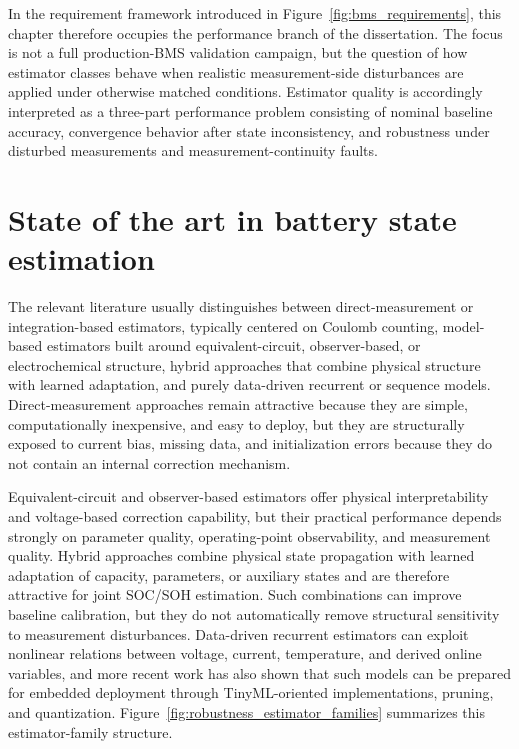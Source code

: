 \documentclass[
    a4paper,
    12pt,
    titlepage,
    bibliography=totoc,
    twoside=on,
    parskip=false,
    numbers=noenddot,
    cleardoublepage=empty,
    DIV=12,
    BCOR=12.0mm,
    headheight=36pt,
    headings=openright
]{scrreprt}
\begin{document}
In the requirement framework introduced in Figure~\ref{fig:bms_requirements}, this chapter therefore occupies the performance branch of the dissertation. The focus is not a full production-BMS validation campaign, but the question of how estimator classes behave when realistic measurement-side disturbances are applied under otherwise matched conditions. Estimator quality is accordingly interpreted as a three-part performance problem consisting of nominal baseline accuracy, convergence behavior after state inconsistency, and robustness under disturbed measurements and measurement-continuity faults.

\section{State of the art in battery state estimation}
The relevant literature usually distinguishes between direct-measurement or integration-based estimators, typically centered on Coulomb counting, model-based estimators built around equivalent-circuit, observer-based, or electrochemical structure, hybrid approaches that combine physical structure with learned adaptation, and purely data-driven recurrent or sequence models.\autocite{khanComparativeStudyDifferent2022,shrivastavaReviewTechnologicalAdvancement2023,guoSystematicReviewElectrochemical2024,yaoSmarterBatteryManagement2025b} Direct-measurement approaches remain attractive because they are simple, computationally inexpensive, and easy to deploy, but they are structurally exposed to current bias, missing data, and initialization errors because they do not contain an internal correction mechanism.\autocite{khanComparativeStudyDifferent2022,liRobustnessSOCEstimation2015}

Equivalent-circuit and observer-based estimators offer physical interpretability and voltage-based correction capability, but their practical performance depends strongly on parameter quality, operating-point observability, and measurement quality.\autocite{gaoEnhancedStateofchargeEstimation2022,guoSystematicReviewElectrochemical2024,liRobustnessSOCEstimation2015} Hybrid approaches combine physical state propagation with learned adaptation of capacity, parameters, or auxiliary states and are therefore attractive for joint SOC/SOH estimation.\autocite{gaoCoEstimationStateofChargeStateof2022,shenAlternativeCombinedCoestimation2022,wangFusionEstimationLithiumion2022} Such combinations can improve baseline calibration, but they do not automatically remove structural sensitivity to measurement disturbances. Data-driven recurrent estimators can exploit nonlinear relations between voltage, current, temperature, and derived online variables, and more recent work has also shown that such models can be prepared for embedded deployment through TinyML-oriented implementations, pruning, and quantization.\autocite{mondalEstimatingStateofChargeLithiumIon2024,Embedded_AI_only_SOC_mobile,giazitzisCaseStudyTiny2024,mazziStateChargeEstimation2022,yaoSmarterBatteryManagement2025b} Figure~\ref{fig:robustness_estimator_families} summarizes this estimator-family structure.
\end{document}
